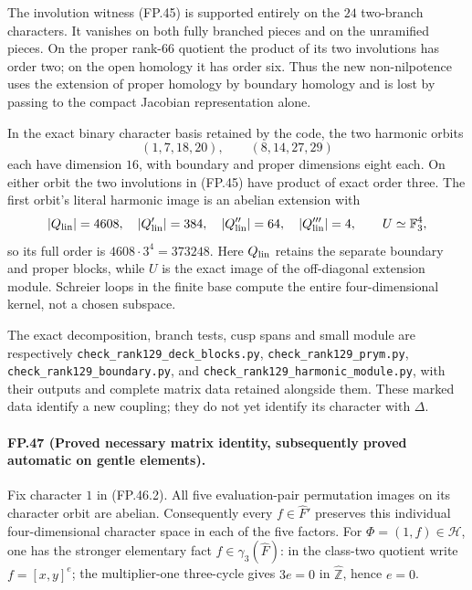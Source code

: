 The involution witness (FP.45) is supported entirely on the
$24$ two-branch characters. It vanishes on both fully branched
pieces and on the unramified pieces. On the proper rank-$66$
quotient the product of its two involutions has order two;
on the open homology it has order six. Thus the new
non-nilpotence uses the extension of proper homology by
boundary homology and is lost by passing to the compact
Jacobian representation alone.

In the exact binary character basis retained by the code, the
two harmonic orbits
\[
          (1,7,18,20),\qquad (8,14,27,29)
 \tag{FP.46.2}
\]
each have dimension $16$, with boundary and proper dimensions
eight each. On either orbit the two involutions in (FP.45)
have product of exact order three. The first orbit's literal
harmonic image is an abelian extension with
\[
 |Q_{\rm lin}|=4608,\quad
 |Q_{\rm lin}'|=384,\quad |Q_{\rm lin}''|=64,
 \quad |Q_{\rm lin}'''|=4,
 \qquad U\simeq\mathbb F_3^4,
\]
so its full order is $4608\cdot3^4=373248$.
Here $Q_{\rm lin}$ retains the separate boundary and proper
blocks, while $U$ is the exact image of the off-diagonal
extension module. Schreier loops in the finite base compute
the entire four-dimensional kernel, not a chosen subspace.

The exact decomposition, branch tests, cusp spans and small
module are respectively
\texttt{check\_rank129\_deck\_blocks.py},
\texttt{check\_rank129\_prym.py},
\texttt{check\_rank129\_boundary.py}, and
\texttt{check\_rank129\_harmonic\_module.py}, with their
outputs and complete matrix data retained alongside them.
These marked data identify a new coupling; they do not yet
identify its character with $\Delta$.

\paragraph{FP.47 (Proved necessary matrix identity, subsequently proved automatic on gentle elements).}
Fix character $1$ in (FP.46.2). All five evaluation-pair
permutation images on its character orbit are abelian.
Consequently every $f\in\widehat F'$ preserves this individual
four-dimensional character space in each of the five factors.
For $\Phi=(1,f)\in\mathcal H$, one has the stronger elementary
fact $f\in\gamma_3(\widehat F)$: in the class-two quotient
write $f=[x,y]^e$; the multiplier-one three-cycle gives
$3e=0$ in $\widehat{\mathbb Z}$, hence $e=0$.

